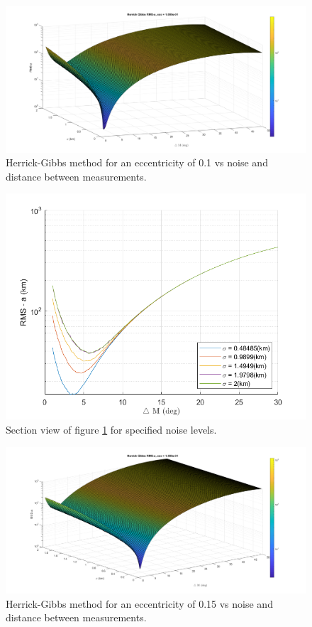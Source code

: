 \documentclass[12pt]{article}
\begin{document}
	
	\begin{figure}[H]
		\centering
		\includegraphics[width=0.7\linewidth]{herrickgibbs_e_1}
		\caption{Herrick-Gibbs method for an eccentricity of 0.1 vs noise and distance between measurements.}
		\label{fig:herrickgibbse1}
	\end{figure}
	\begin{figure}[H]
		\centering
		\includegraphics[width=0.7\linewidth]{heck_gibbs_e_1_side}
		\caption{Section view of figure \ref{fig:herrickgibbse1} for specified noise levels.}
		\label{fig:heckgibbse1side}
	\end{figure}
	\begin{figure}[H]
		\centering
		\includegraphics[width=0.7\linewidth]{herrickgibbs_e_15}
		\caption{Herrick-Gibbs method for an eccentricity of 0.15 vs noise and distance between measurements.}
		\label{fig:herrickgibbse15}
	\end{figure}
\end{document}
